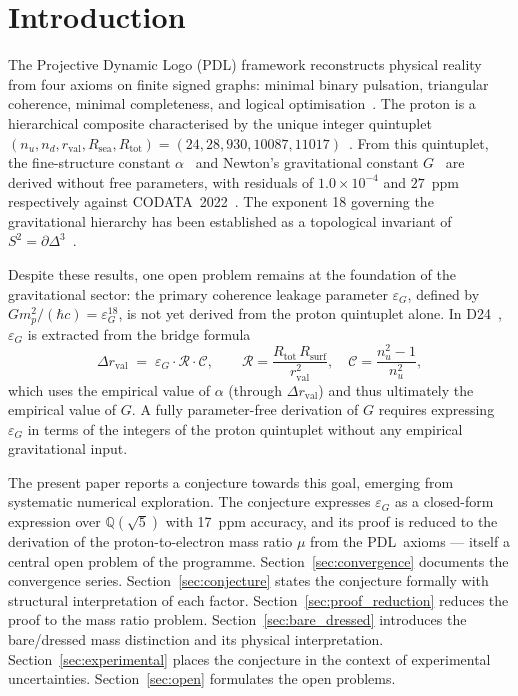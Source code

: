 \documentclass[11pt,a4paper]{article}
\theoremstyle{definition}
\newcommand{\PDL}{\textnormal{PDL}}
\newcommand{\Rsurf}{R_{\mathrm{surf}}}
\newcommand{\Rsea}{R_{\mathrm{sea}}}
\newcommand{\Rtot}{R_{\mathrm{tot}}}
\newcommand{\rval}{r_{\mathrm{val}}}
\newcommand{\epsg}{\varepsilon_G}
\newcommand{\Sfour}{\partial\Delta^3}
\newcommand{\calR}{\mathcal{R}}
\newcommand{\calC}{\mathcal{C}}
\newcommand{\drval}{\Delta r_{\mathrm{val}}}
\begin{document}
\newpage
\tableofcontents

\section{Introduction}
\label{sec:intro}

The Projective Dynamic Logo (\PDL) framework reconstructs physical reality from four axioms on finite signed graphs: minimal binary pulsation, triangular coherence, minimal completeness, and logical optimisation~\cite{PDL_Main_2026,PDL_Intro_2026}. The proton is a hierarchical composite characterised by the unique integer quintuplet $(n_u, n_d, \rval, \Rsea, \Rtot) = (24, 28, 930, 10087, 11017)$~\cite{Combinatorial_Proton_v2_2026}. From this quintuplet, the fine-structure constant $\alpha$~\cite{Alpha_PDL_v2_2026} and Newton's gravitational constant $G$~\cite{Bridge_PDL_2026} are derived without free parameters, with residuals of $1.0\times10^{-4}$ and $27$~ppm respectively against CODATA~2022~\cite{CODATA_2022}. The exponent 18 governing the gravitational hierarchy has been established as a topological invariant of $S^2 = \Sfour$~\cite{Topology_18_PDL_2026}.

Despite these results, one open problem remains at the foundation of the gravitational sector: the primary coherence leakage parameter $\epsg$, defined by $G m_p^2/(\hbar c) = \epsg^{18}$, is not yet derived from the proton quintuplet alone. In D24~\cite{Bridge_PDL_2026}, $\epsg$ is extracted from the bridge formula
\begin{equation}
\label{eq:bridge}
\drval \;=\; \epsg \cdot \calR \cdot \calC, \qquad \calR = \frac{\Rtot\,\Rsurf}{\rval^2}, \quad \calC = \frac{n_u^2-1}{n_u^2},
\end{equation}
which uses the empirical value of $\alpha$ (through $\drval$) and thus ultimately the empirical value of $G$. A fully parameter-free derivation of $G$ requires expressing $\epsg$ in terms of the integers of the proton quintuplet without any empirical gravitational input.

The present paper reports a conjecture towards this goal, emerging from systematic numerical exploration. The conjecture expresses $\epsg$ as a closed-form expression over $\mathbb{Q}(\sqrt{5})$ with 17~ppm accuracy, and its proof is reduced to the derivation of the proton-to-electron mass ratio $\mu$ from the \PDL\ axioms --- itself a central open problem of the programme. Section~\ref{sec:convergence} documents the convergence series. Section~\ref{sec:conjecture} states the conjecture formally with structural interpretation of each factor. Section~\ref{sec:proof_reduction} reduces the proof to the mass ratio problem. Section~\ref{sec:bare_dressed} introduces the bare/dressed mass distinction and its physical interpretation. Section~\ref{sec:experimental} places the conjecture in the context of experimental uncertainties. Section~\ref{sec:open} formulates the open problems.
\end{document}
